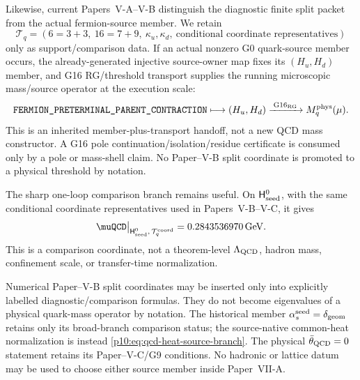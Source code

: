 \documentclass[12pt,a4paper]{article}
\providecommand{\deltageom}{\delta_{\rm geom}}
\providecommand{\alphasseed}{\alpha_s^{\rm seed}}
\providecommand{\Hseedzero}{\mathsf H_{\rm seed}^{0}}
\begin{document}
Likewise, current Papers~V-A--V-B distinguish the diagnostic finite split packet from the actual fermion-source member.  We retain
\begin{equation}
\mathcal T_q=(6=3+3,\ 16=7+9,\ \kappa_u,\kappa_d,\ \text{conditional coordinate representatives})
\end{equation}
only as support/comparison data.  If an actual nonzero G0 quark-source member occurs, the already-generated injective source-owner map fixes its \((H_u,H_d)\) member, and G16 RG/threshold transport supplies the running microscopic mass/source operator at the execution scale:
\begin{equation}
\label{p10:eq:qrg-quark-mass-operator-needed}
\texttt{FERMION\_PRETERMINAL\_PARENT\_CONTRACTION}
\longmapsto(H_u,H_d)
\xrightarrow{\;\mathrm{G16}_{\rm RG}\;}M_q^{\rm phys}(\mu).
\end{equation}
This is an inherited member-plus-transport handoff, not a new QCD mass constructor.  A G16 pole continuation/isolation/residue certificate is consumed only by a pole or mass-shell claim.  No Paper--V-B split coordinate is promoted to a physical threshold by notation.

The sharp one-loop comparison branch remains useful.  On \(\Hseedzero\), with the same conditional coordinate representatives used in Papers~V-B--V-C, it gives
\begin{equation}
\label{p10:eq:qcd-interface-scale-import}
\muQCD\big|_{\Hseedzero,\,\mathcal T_q^{\rm coord}}
=0.2843536970\,\mathrm{GeV}.
\end{equation}
This is a comparison coordinate, not a theorem-level \(\Lambda_{\rm QCD}\), hadron mass, confinement scale, or transfer-time normalization.

\begin{definition}
\label{p10:def:paper-vi-numerical-import-convention}
Numerical Paper--V-B split coordinates may be inserted only into explicitly labelled diagnostic/comparison formulas.  They do not become eigenvalues of a physical quark-mass operator by notation.  The historical member \(\alphasseed=\deltageom\) retains only its broad-branch comparison status; the source-native common-heat normalization is instead \eqref{p10:eq:qcd-heat-source-branch}.  The physical \(\bar\theta_{\rm QCD}=0\) statement retains its Paper--V-C/G9 conditions.  No hadronic or lattice datum may be used to choose either source member inside Paper~VII-A.
\end{definition}
\end{document}
